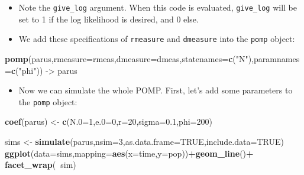 \documentclass[]{article}
\newenvironment{Shaded}{\begin{snugshade}}{\end{snugshade}}
\newcommand{\KeywordTok}[1]{\textcolor[rgb]{0.13,0.29,0.53}{\textbf{#1}}}
\newcommand{\DataTypeTok}[1]{\textcolor[rgb]{0.13,0.29,0.53}{#1}}
\newcommand{\DecValTok}[1]{\textcolor[rgb]{0.00,0.00,0.81}{#1}}
\newcommand{\FloatTok}[1]{\textcolor[rgb]{0.00,0.00,0.81}{#1}}
\newcommand{\StringTok}[1]{\textcolor[rgb]{0.31,0.60,0.02}{#1}}
\newcommand{\OtherTok}[1]{\textcolor[rgb]{0.56,0.35,0.01}{#1}}
\newcommand{\OperatorTok}[1]{\textcolor[rgb]{0.81,0.36,0.00}{\textbf{#1}}}
\newcommand{\NormalTok}[1]{#1}
\providecommand{\tightlist}{%
  \setlength{\itemsep}{0pt}\setlength{\parskip}{0pt}}
\begin{document}
\begin{itemize}
\item
  Note the \texttt{give\_log} argument. When this code is evaluated,
  \texttt{give\_log} will be set to 1 if the log likelihood is desired,
  and 0 else.
\item
  We add these specifications of \texttt{rmeasure} and \texttt{dmeasure}
  into the \texttt{pomp} object:
\end{itemize}

\begin{Shaded}
\begin{Highlighting}[]
\KeywordTok{pomp}\NormalTok{(parus,}\DataTypeTok{rmeasure=}\NormalTok{rmeas,}\DataTypeTok{dmeasure=}\NormalTok{dmeas,}\DataTypeTok{statenames=}\KeywordTok{c}\NormalTok{(}\StringTok{"N"}\NormalTok{),}\DataTypeTok{paramnames=}\KeywordTok{c}\NormalTok{(}\StringTok{"phi"}\NormalTok{)) ->}\StringTok{ }\NormalTok{parus}
\end{Highlighting}
\end{Shaded}

\begin{itemize}
\tightlist
\item
  Now we can simulate the whole POMP. First, let's add some parameters
  to the \texttt{pomp} object:
\end{itemize}

\begin{Shaded}
\begin{Highlighting}[]
\KeywordTok{coef}\NormalTok{(parus) <-}\StringTok{ }\KeywordTok{c}\NormalTok{(}\DataTypeTok{N.0=}\DecValTok{1}\NormalTok{,}\DataTypeTok{e.0=}\DecValTok{0}\NormalTok{,}\DataTypeTok{r=}\DecValTok{20}\NormalTok{,}\DataTypeTok{sigma=}\FloatTok{0.1}\NormalTok{,}\DataTypeTok{phi=}\DecValTok{200}\NormalTok{)}
\end{Highlighting}
\end{Shaded}

\begin{Shaded}
\begin{Highlighting}[]
\NormalTok{sims <-}\StringTok{ }\KeywordTok{simulate}\NormalTok{(parus,}\DataTypeTok{nsim=}\DecValTok{3}\NormalTok{,}\DataTypeTok{as.data.frame=}\OtherTok{TRUE}\NormalTok{,}\DataTypeTok{include.data=}\OtherTok{TRUE}\NormalTok{)}
\KeywordTok{ggplot}\NormalTok{(}\DataTypeTok{data=}\NormalTok{sims,}\DataTypeTok{mapping=}\KeywordTok{aes}\NormalTok{(}\DataTypeTok{x=}\NormalTok{time,}\DataTypeTok{y=}\NormalTok{pop))}\OperatorTok{+}\KeywordTok{geom_line}\NormalTok{()}\OperatorTok{+}
\StringTok{  }\KeywordTok{facet_wrap}\NormalTok{(}\OperatorTok{~}\NormalTok{sim)}
\end{Highlighting}
\end{Shaded}
\end{document}

